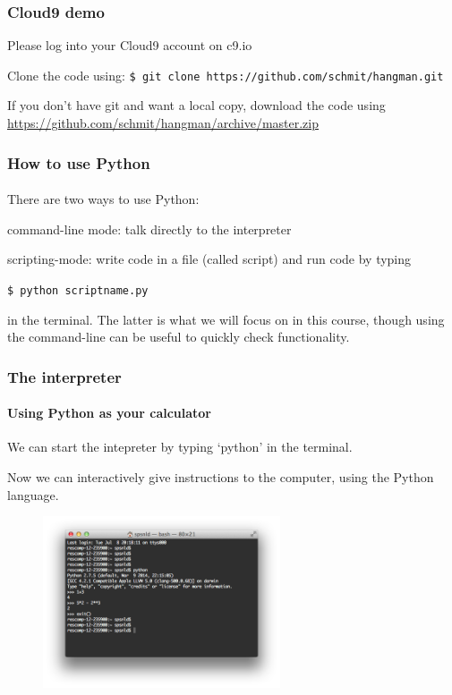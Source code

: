 \begin{frame}\frametitle{Cloud9 demo}

    Please log into your Cloud9 account on c9.io

    \vfill

    Clone the code using:
    \texttt{\$ git clone https://github.com/schmit/hangman.git}

    \vfill

    If you don't have git and want a local copy, download the code using
    \url{https://github.com/schmit/hangman/archive/master.zip}

\end{frame}

\begin{frame}\frametitle{How to use Python}
    \framesubtitle{}

    There are two ways to use Python:

    \vfill

    command-line mode: talk directly to the interpreter

    \vfill

    scripting-mode: write code in a file (called script) and run code by typing\\
    \begin{center}
        \texttt{\$ python scriptname.py}
    \end{center}
    in the terminal.
    \vfill
    The latter is what we will focus on in this course, though using the command-line
    can be useful to quickly check functionality.
\end{frame}


\begin{frame}\frametitle{The interpreter}
    \framesubtitle{Using Python as your calculator}

    We can start the intepreter by typing `python' in the terminal.

    \vfill

    Now we can interactively give instructions to the computer, using the Python language.

    \vfill

    \begin{figure}
        \centering
        \centering
        \includegraphics[height=2.0in]{"img/python_terminal"}
        \label{fig:terminal}
    \end{figure}

\end{frame}

